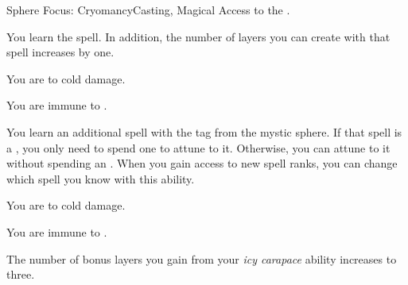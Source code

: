     \begin{feat}{Sphere Focus: Cryomancy}{Casting, Magical}
        \featpre Access to the  .

         You learn the  spell.
        In addition, the number of layers you can create with that spell increases by one.

         You are  to cold damage.

         You are immune to .

         You learn an additional spell with the  tag from the  mystic sphere.
        If that spell is a , you only need to spend one  to attune to it.
        Otherwise, you can attune to it without spending an .
        When you gain access to new spell ranks, you can change which spell you know with this ability.

         You are  to cold damage.

         You are immune to .

         The number of bonus layers you gain from your \textit{icy carapace} ability increases to three.
    \end{feat}

